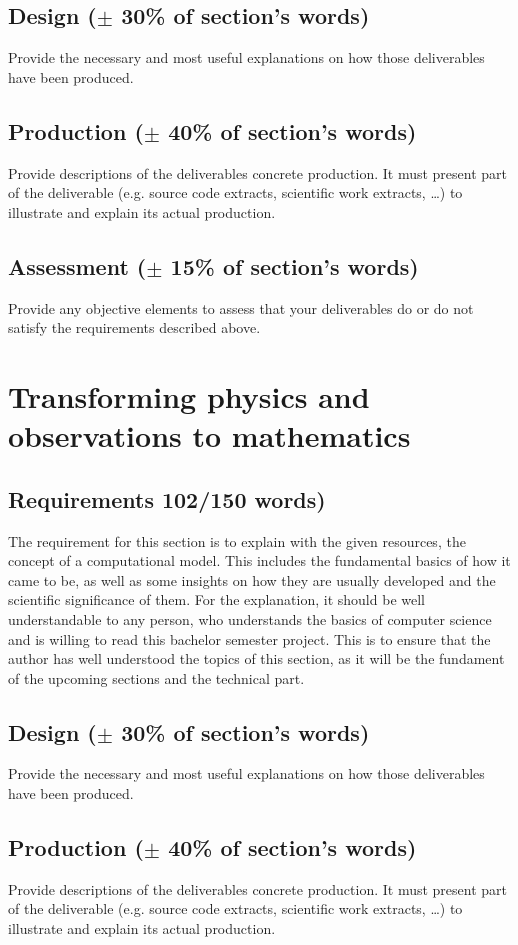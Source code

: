 \documentclass[conference,compsoc]{IEEEtran}
\begin{document}
\subsection{Design ($\pm$ 30\% of section's words)}
Provide the necessary and most useful explanations on how those deliverables have been produced.
\subsection{Production ($\pm$ 40\% of section's words)}
Provide descriptions of the deliverables concrete production. It must present part of the deliverable (e.g. source code extracts, scientific work extracts, \ldots) to illustrate and explain its actual production.
\subsection{Assessment ($\pm$ 15\% of section's words)}
Provide any objective elements to assess that your deliverables do or do not satisfy the requirements described above. 


\section{Transforming physics and observations to mathematics}
\label{sec-computational-model}
\subsection{Requirements 102/150 words)}
The requirement for this section is to explain with the given resources, the concept of a computational model. This includes the fundamental basics of how it came to be, as well as some insights on how they are usually developed and the scientific significance of them. For the explanation, it should be well understandable to any person, who understands the basics of computer science and is willing to read this bachelor semester project. This is to ensure that the author has well understood the topics of this section, as it will be the fundament of the upcoming sections and the technical part.
\subsection{Design ($\pm$ 30\% of section's words)}
Provide the necessary and most useful explanations on how those deliverables have been produced.
\subsection{Production ($\pm$ 40\% of section's words)}
Provide descriptions of the deliverables concrete production. It must present part of the deliverable (e.g. source code extracts, scientific work extracts, \ldots) to illustrate and explain its actual production.
\end{document}
